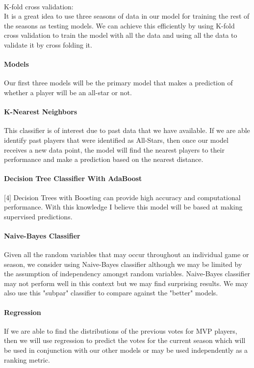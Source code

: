 \documentclass{article}
\begin{document}
\paragraph{}
K-fold cross validation: \\
It is a great idea to use three seasons of data in our model for training the rest of the seasons as testing models. We can achieve this efficiently by using K-fold cross validation to train the model with all the data and using all the data to validate it by cross folding it.
\paragraph*{\textbf{Models}}
Our first three models will be the primary model that makes a prediction of whether a player will be an all-star or not.
\paragraph{K-Nearest Neighbors} This classifier is of interest due to past data that we have available. If we are able identify past players that were identified as All-Stars, then once our model receives a new data point, the model will find the nearest players to their performance and make a prediction based on the nearest distance.
\paragraph{Decision Tree Classifier With AdaBoost} [4] Decision Trees with Boosting can provide high accuracy and computational performance. With this knowledge I believe this model will be based at making supervised predictions. 
\paragraph{Naive-Bayes Classifier} Given all the random variables that may occur throughout an individual game or season, we consider using Naive-Bayes classifier although we may be limited by the assumption of independency amongst random variables. Naive-Bayes classifier may not perform well in this context but we may find surprising results. We may also use this "subpar" classifier to compare against the "better" models.
\paragraph{Regression}
If we are able to find the distributions of the previous votes for MVP players, then we will use regression to predict the votes for the current season which will be used in conjunction with our other models or may be used independently as a ranking metric.
\end{document}
